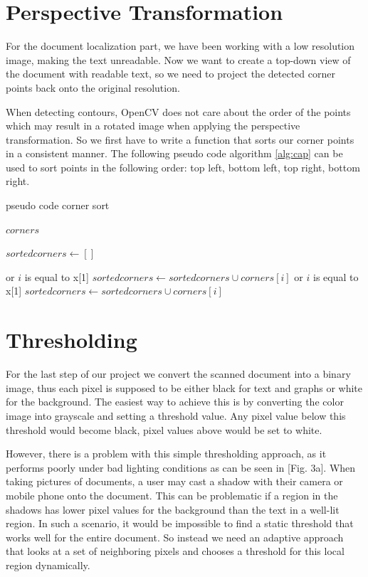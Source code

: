 \documentclass[bibliography=totoc]{scrartcl}
\begin{document}
	\section{Perspective Transformation}
	For the document localization part, we have been working with a low resolution image, making the text unreadable.
	Now we want to create a top-down view of the document with readable text, so we need to project the detected corner points back onto the original resolution. 

	When detecting contours, OpenCV does not care about the order of the points which may result in a rotated image when applying the perspective transformation.
	So we first have to write a function that sorts our corner points in a consistent manner.
	The following pseudo code algorithm \ref{alg:cap} can be used to sort points in the following order: top left, bottom left, top right, bottom right.


\begin{algorithm}[hbt!]
\caption{pseudo code corner sort}\label{alg:cap}
\begin{algorithmic}
\Require $corners$

\State $sortedcorners \gets []$

 or $i$ is equal to x[1]
    \State $sortedcorners \gets sortedcorners \cup corners[i]$
\EndIf
\EndWhile
{}
 or $i$ is equal to x[1]
    \State $sortedcorners \gets sortedcorners \cup corners[i]$
    
\EndIf
\EndWhile
\end{algorithmic}
\end{algorithm}
	
	\section{Thresholding}
	For the last step of our project we convert the scanned document into a binary image, thus each pixel is supposed to be either black for text and graphs or white for the background.
	The easiest way to achieve this is by converting the color image into grayscale and setting a threshold value. 
	Any pixel value below this threshold would become black, pixel values above would be set to white.

	However, there is a problem with this simple thresholding approach, as it performs poorly under bad lighting conditions as can be seen in [Fig. 3a].
	When taking pictures of documents, a user may cast a shadow with their camera or mobile phone onto the document. 
	This can be problematic if a region in the shadows has lower pixel values for the background than the text in a well-lit region.
	In such a scenario, it would be impossible to find a static threshold that works well for the entire document.
	So instead we need an adaptive approach that looks at a set of neighboring pixels and chooses a threshold for this local region dynamically.
\end{document}
